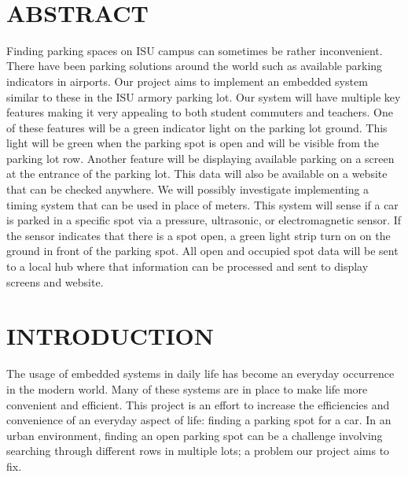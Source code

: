 \documentclass[12pt]{article}
\begin{document}
\begin{titlepage}
\begin{minipage}{0.8\textwidth}
\begin{flushleft}
		\end{flushleft}
	\end{minipage}\\[2 cm]
	
	\vfill
	
\end{titlepage}

\tableofcontents
\pagebreak

\section{ABSTRACT}
Finding parking spaces on ISU campus can sometimes be rather inconvenient. There have been parking solutions around the world such as available parking indicators in airports. Our project aims to implement an embedded system similar to these in the ISU armory parking lot. Our system will have multiple key features making it very appealing to both student commuters and teachers. One of these features will be a green indicator light on the parking lot ground. This light will be green when the parking spot is open and will be visible from the parking lot row. Another feature will be displaying available parking on a screen at the entrance of the parking lot. This data will also be available on a website that can be checked anywhere. We will possibly investigate implementing a timing system that can be used in place of meters. This system will sense if a car is parked in a specific spot via a pressure, ultrasonic, or electromagnetic sensor. If the sensor indicates that there is a spot open, a green light strip turn on on the ground in front of the parking spot. All open and occupied spot data will be sent to a local hub where that information can be processed and sent to display screens and website.

\section{INTRODUCTION}

The usage of embedded systems in daily life has become an everyday occurrence in the modern world. Many of these systems are in place to make life more convenient and efficient. This project is an effort to increase the efficiencies and convenience of an everyday aspect of life: finding a parking spot for a car. In an urban environment, finding an open parking spot can be a challenge involving searching through different rows in multiple lots; a problem our project aims to fix.
\end{document}

